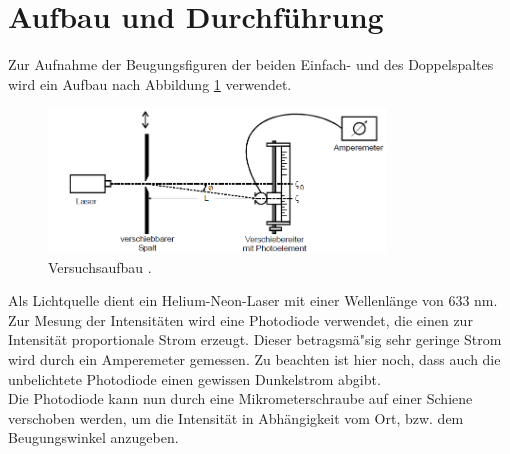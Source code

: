 \section{Aufbau und Durchführung}
\label{sec:Aufbau und Durchführung}
Zur Aufnahme der Beugungsfiguren der beiden Einfach- und des Doppelspaltes wird ein Aufbau nach Abbildung \ref{fig:Versuchsanordnung} verwendet.
\begin{figure}[H]
    \centering
    \includegraphics[width=0.8\textwidth]{Versuchsanordnung.png}
    \caption{Versuchsaufbau \cite{1}.}
    \label{fig:Versuchsanordnung}
\end{figure}
\noindent
Als Lichtquelle dient ein Helium-Neon-Laser mit einer Wellenlänge von 633 nm.
 Zur Mesung der Intensitäten wird eine Photodiode verwendet, die einen zur Intensität proportionale Strom erzeugt. 
 Dieser betragsmä"sig sehr geringe Strom wird durch ein Amperemeter gemessen. 
 Zu beachten ist hier noch, dass auch die unbelichtete Photodiode einen gewissen Dunkelstrom abgibt.\\
Die Photodiode kann nun durch eine Mikrometerschraube auf einer Schiene verschoben werden, um die Intensität in Abhängigkeit vom Ort,
 bzw. dem Beugungswinkel anzugeben.

